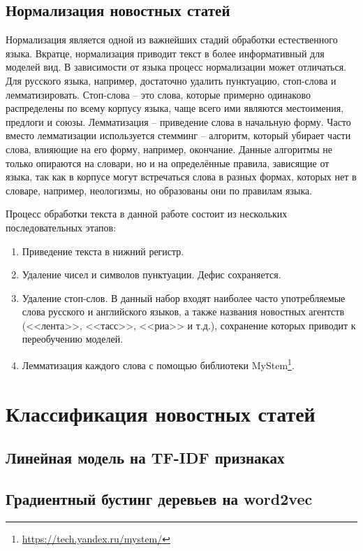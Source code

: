 \documentclass[a4paper, 14pt]{extarticle}
\begin{document}
\subsection{Нормализация новостных статей}
Нормализация является одной из важнейших стадий обработки естественного языка. Вкратце, нормализация приводит текст в более информативный для моделей вид. В зависимости от языка процесс нормализации может отличаться. Для русского языка, например, достаточно удалить пунктуацию, стоп-слова и лемматизировать. Стоп-слова -- это слова, которые примерно одинаково распределены по всему корпусу языка, чаще всего ими являются местоимения, предлоги и союзы. Лемматизация -- приведение слова в начальную форму. Часто вместо лемматизации используется стемминг -- алгоритм, который убирает части слова, влияющие на его форму, например, окончание. Данные алгоритмы не только опираются на словари, но и на определённые правила, зависящие от языка, так как в корпусе могут встречаться слова в разных формах, которых нет в словаре, например, неологизмы, но образованы они по правилам языка.

Процесс обработки текста в данной работе состоит из нескольких последовательных этапов:
\begin{enumerate}
	\item Приведение текста в нижний регистр.
	\item Удаление чисел и символов пунктуации. Дефис сохраняется.
	\item Удаление стоп-слов. В данный набор входят наиболее часто употребляемые слова русского и английского языков,
	а также названия новостных агентств (<<лента>>, <<тасс>>, <<риа>> и т.д.), сохранение которых приводит к переобучению моделей.
	\item Лемматизация каждого слова с помощью библиотеки MyStem\footnote{\url{https://tech.yandex.ru/mystem/}}.
\end{enumerate}

\section{Классификация новостных статей}
\subsection{Линейная модель на TF-IDF признаках}
\subsection{Градиентный бустинг деревьев на word2vec}
\end{document}
